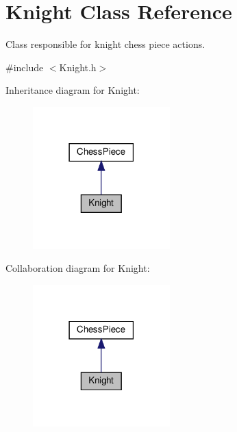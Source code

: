 \hypertarget{classKnight}{}\section{Knight Class Reference}
\label{classKnight}


Class responsible for knight chess piece actions.  




{\ttfamily \#include $<$Knight.\+h$>$}



Inheritance diagram for Knight\+:\nopagebreak
\begin{figure}[H]
\begin{center}
\leavevmode
\includegraphics[width=150pt]{classKnight__inherit__graph}
\end{center}
\end{figure}


Collaboration diagram for Knight\+:\nopagebreak
\begin{figure}[H]
\begin{center}
\leavevmode
\includegraphics[width=150pt]{classKnight__coll__graph}
\end{center}
\end{figure}
